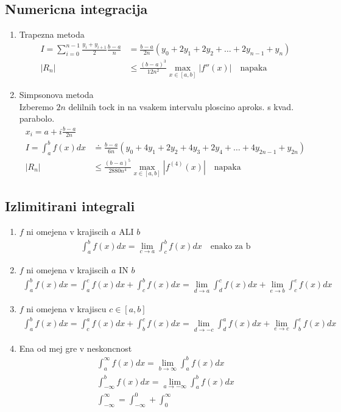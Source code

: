 \documentclass[a4paper,oneside,8pt]{extarticle}
\theoremstyle{definition}
\newcommand\abs[1]{\left|#1\right|}
\begin{document}
\begin{multicols}{2}
	\subsection*{Numericna integracija}
	\begin{enumerate}
		\item Trapezna metoda
		\begin{align*}
			I = \sum_{i=0}^{n-1} \frac{y_i +y_{i+1}}{2} \frac{b - a}{n} &= \frac{b-a}{2n} (y_0 + 2y_1 + 2y_2 + \dots + 2y_{n-1} + y_{n})\\
			\abs{R_n} &\leq \frac{(b-a)^3}{12n^2} \max_{x \in [a,b]} \abs{f''(x)} \quad \text{napaka}
		\end{align*}
		\item Simpsonova metoda\\
		Izberemo $2n$ delilnih tock in na vsakem intervalu ploscino aproks. s kvad. parabolo.
		\begin{align*}
			x_i = a + i\frac{b-a}{2n}\\
			I = \int_{a}^{b} f(x)dx &\doteq \frac{b-a}{6n} (y_0 + 4y_1 + 2y_2 + 4y_3 + 2y_4 + \dots + 4y_{2n-1} + y_{2n})\\
			\abs{R_n} &\leq \frac{(b-a)^5}{2880n^4} \max_{x \in [a,b]} \abs{f^{(4)}(x)} \quad \text{napaka}
		\end{align*}
	\end{enumerate}
%
	\subsection*{Izlimitirani integrali}
	\begin{enumerate}
		\item $f$ ni omejena v krajiscih $a$ ALI $b$
		\begin{align*}
			\int_{a}^{b} f(x)dx = \lim_{c \to a} \int_{c}^{b} f(x)dx \quad \text{enako za b}
		\end{align*}
		\item $f$ ni omejena v krajiscih $a$ IN $b$
		\begin{align*}
			\int_{a}^{b} f(x)dx = \int_{a}^{c} f(x)dx + \int_{c}^{b} f(x)dx = \lim_{d\to a} \int_{d}^{c} f(x)dx + \lim_{e\to b} \int_{c}^{e} f(x)dx  
		\end{align*}
		\item $f$ ni omejena v krajiscu $c \in [a,b]$
		\begin{align*}
			\int_{a}^{b} f(x)dx = \int_{c}^{a} f(x)dx + \int_{b}^{c} f(x)dx = \lim_{d \to -c} \int_{d}^{a} f(x)dx + \lim_{e \to c} \int_{b}^{e} f(x)dx
		\end{align*}
		\item Ena od mej gre v neskoncnost
		\begin{align*}
			\int_{a}^{\infty} f(x)dx = \lim_{b \to \infty}\int_{a}^{b} f(x)dx\\
			\int_{-\infty}^{b} f(x)dx = \lim_{a \to -\infty}\int_{a}^{b} f(x)dx\\
			\int_{-\infty}^{\infty} = \int_{-\infty}^{0} + \int_{0}^{\infty}
		\end{align*}
	\end{enumerate}
%

\end{multicols}
\end{document}
